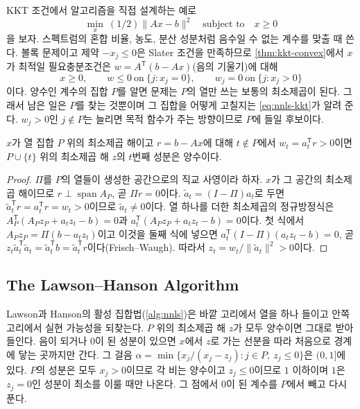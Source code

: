 KKT 조건에서 알고리즘을 직접 설계하는 예로 
\begin{equation}
\label{eq:nnls}
\min_x\ (1/2)\|Ax-b\|^2\quad\text{subject to}\quad x\ge0
\end{equation}
을 보자. 스펙트럼의 혼합 비율, 농도, 분산 성분처럼 음수일 수 없는 계수를 맞출 때 쓴다. 볼록 문제이고 제약 $-x_j\le0$은 Slater 조건을 만족하므로 \cref{thm:kkt-convex}에서 $x$가 최적일 필요충분조건은 $w=A^{\mathsf T}(b-Ax)$(음의 기울기)에 대해
\begin{equation}
\label{eq:nnls-kkt}
x\ge0,\qquad w\le0\ \text{on}\ \{j:x_j=0\},\qquad w_j=0\ \text{on}\ \{j:x_j>0\}
\end{equation}
이다. 양수인 계수의 집합 $P$를 알면 문제는 $P$의 열만 쓰는 보통의 최소제곱이 된다. 그래서 남은 일은 $P$를 찾는 것뿐이며 그 집합을 어떻게 고칠지는 \cref{eq:nnls-kkt}가 알려 준다. $w_j>0$인 $j\notin P$는 늘리면 목적 함수가 주는 방향이므로 $P$에 들일 후보이다.

\begin{lemma}
\label{lem:nnls-enter}
$x$가 열 집합 $P$ 위의 최소제곱 해이고 $r=b-Ax$에 대해 $t\notin P$에서 $w_t=a_t^{\mathsf T}r>0$이면 $P\cup\{t\}$ 위의 최소제곱 해 $z$의 $t$번째 성분은 양수이다.
\end{lemma}

\begin{proof}
$\Pi$를 $P$의 열들이 생성한 공간으로의 직교 사영이라 하자. $x$가 그 공간의 최소제곱 해이므로 $r\perp\operatorname{span}A_P$, 곧 $\Pi r=0$이다. $\tilde a_t=(I-\Pi)a_t$로 두면 $\tilde a_t^{\mathsf T}r=a_t^{\mathsf T}r=w_t>0$이므로 $\tilde a_t\ne0$이다. 열 하나를 더한 최소제곱의 정규방정식은 $A_P^{\mathsf T}(A_Pz_P+a_tz_t-b)=0$과 $a_t^{\mathsf T}(A_Pz_P+a_tz_t-b)=0$이다. 첫 식에서 $A_Pz_P=\Pi(b-a_tz_t)$이고 이것을 둘째 식에 넣으면 $a_t^{\mathsf T}(I-\Pi)(a_tz_t-b)=0$, 곧 $z_t\tilde a_t^{\mathsf T}\tilde a_t=\tilde a_t^{\mathsf T}b=\tilde a_t^{\mathsf T}r$이다(Frisch--Waugh). 따라서 $z_t=w_t/\|\tilde a_t\|^2>0$이다.
\end{proof}

\subsection{The Lawson--Hanson Algorithm}

Lawson과 Hanson\cite{lawson1995}의 활성 집합법(\cref{alg:nnls})은 바깥 고리에서 열을 하나 들이고 안쪽 고리에서 실현 가능성을 되찾는다. $P$ 위의 최소제곱 해 $z$가 모두 양수이면 그대로 받아들인다. 음이 되거나 $0$이 된 성분이 있으면 $x$에서 $z$로 가는 선분을 따라 처음으로 경계에 닿는 곳까지만 간다. 그 걸음 $\alpha=\min\{x_j/(x_j-z_j):j\in P,\ z_j\le0\}$은 $(0,1]$에 있다. $P$의 성분은 모두 $x_j>0$이므로 각 비는 양수이고 $z_j\le0$이므로 $1$ 이하이며 $1$은 $z_j=0$인 성분이 최소를 이룰 때만 나온다. 그 점에서 $0$이 된 계수를 $P$에서 빼고 다시 푼다.

